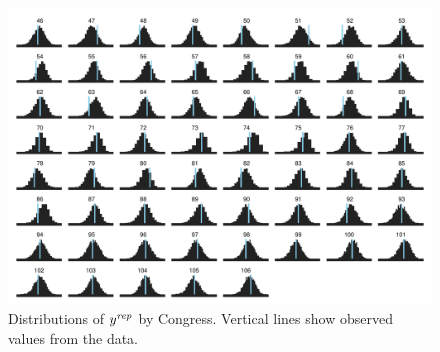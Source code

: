 \begin{figure}
\centering
	\includegraphics[scale=0.55]{sections/figs/ck_pp_by_cong}
\caption{Distributions of $y^{\it rep}$ by Congress. Vertical lines show observed values from the data.}
\label{fig:ck_pp_nWins_hists}
\end{figure}

